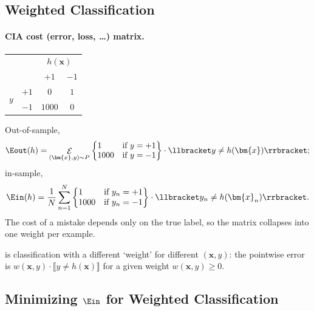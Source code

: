 \subsection{Weighted Classification}

\paragraph{CIA cost (error, loss, \dots) matrix.}
\begin{center}
    \solidrules
    \begin{tabular}{@{}cc|cc@{}}
        \toprule
        & & \multicolumn{2}{c}{\(h(\bm{x})\)}\\
        & & \(+1\) & \(-1\)\\
        \midrule
        \multirow{2}{*}{\(y\)} & \(+1\) & \(0\) & \(1\)\\
        & \(-1\) & \(1000\) & \(0\)\\
        \bottomrule
    \end{tabular}
\end{center}

Out-of-sample,
\[
    \Eout(h) = \mathop{\mathcal{E}}_{(\bm{x}, y) \sim P}
    \left\{ \begin{array}{@{}ll@{}}
        1 & \text{if } y = +1\\
        1000 & \text{if } y = -1
    \end{array} \right\} \cdot \llbracket y \neq h(\bm{x}) \rrbracket ;
\]
in-sample,
\[
    \Ein(h) = \frac{1}{N} \sum_{n=1}^N
    \left\{ \begin{array}{@{}ll@{}}
        1 & \text{if } y_n = +1\\
        1000 & \text{if } y_n = -1
    \end{array} \right\} \cdot \llbracket y_n \neq h(\bm{x}_n) \rrbracket .
\]
The cost of a mistake depends only on the true label, so the matrix collapses
into one weight per example.

\begin{definition}\label{def:weighted}
     is classification with a different
    `weight' for different \((\bm{x}, y)\): the pointwise error is \(w(\bm{x},
    y) \cdot \llbracket y \neq h(\bm{x}) \rrbracket\) for a given weight
    \(w(\bm{x}, y) \ge 0\).
\end{definition}

\subsection{Minimizing \texorpdfstring{\(\Ein\)}{Ein} for Weighted
Classification}

